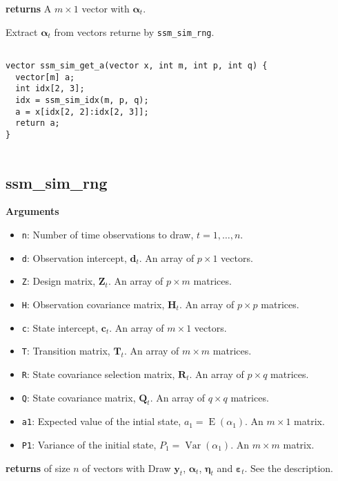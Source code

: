 \documentclass[]{book}
\providecommand{\tightlist}{%
  \setlength{\itemsep}{0pt}\setlength{\parskip}{0pt}}
\DeclareMathOperator{\E}{E}
\DeclareMathOperator{\Var}{Var}
\newcommand{\mat}[1]{\boldsymbol{#1}}
\renewcommand{\vec}[1]{\boldsymbol{#1}}
\begin{document}
\textbf{returns} A \(m \times 1\) vector with \(\vec{\alpha}_t\).

Extract \(\vec{\alpha}_t\) from vectors returne by
\texttt{ssm\_sim\_rng}.

\begin{verbatim}

vector ssm_sim_get_a(vector x, int m, int p, int q) {
  vector[m] a;
  int idx[2, 3];
  idx = ssm_sim_idx(m, p, q);
  a = x[idx[2, 2]:idx[2, 3]];
  return a;
}


\end{verbatim}

\subsection{ssm\_sim\_rng}\label{ssm_sim_rng}

\textbf{Arguments}

\begin{itemize}
\tightlist
\item
  \texttt{n}: Number of time observations to draw, \(t = 1, \dots, n\).
\item
  \texttt{d}: Observation intercept, \(\vec{d}_t\). An array of
  \(p \times 1\) vectors.
\item
  \texttt{Z}: Design matrix, \(\mat{Z}_t\). An array of \(p \times m\)
  matrices.
\item
  \texttt{H}: Observation covariance matrix, \(\mat{H}_t\). An array of
  \(p \times p\) matrices.
\item
  \texttt{c}: State intercept, \(\vec{c}_t\). An array of \(m \times 1\)
  vectors.
\item
  \texttt{T}: Transition matrix, \(\mat{T}_t\). An array of
  \(m \times m\) matrices.
\item
  \texttt{R}: State covariance selection matrix, \(\mat{R} _t\). An
  array of \(p \times q\) matrices.
\item
  \texttt{Q}: State covariance matrix, \(\mat{Q}_t\). An array of
  \(q \times q\) matrices.
\item
  \texttt{a1}: Expected value of the intial state,
  \(a_1 = \E(\alpha_1)\). An \(m \times 1\) matrix.
\item
  \texttt{P1}: Variance of the initial state, \(P_1 = \Var(\alpha_1)\).
  An \(m \times m\) matrix.
\end{itemize}

\textbf{returns} of size \(n\) of vectors with Draw \(\vec{y}_t\),
\(\vec{\alpha}_t\), \(\vec{\eta}_t\) and \(\vec{\varepsilon}_t\). See
the description.
\end{document}
